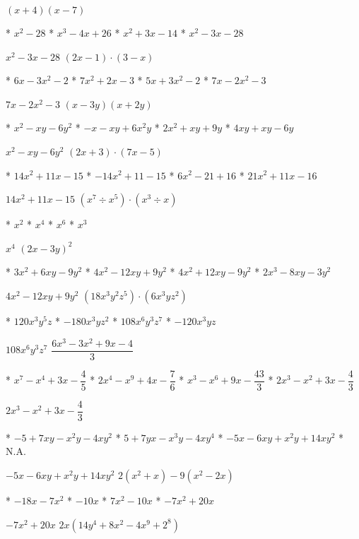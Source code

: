 $(x+4)(x-7)$
\begin{enum}
  * $x^2-28$
  * $x^3-4x+26$
  * $x^2+3x-14$
  * $x^2-3x-28$
\end{enum}
$x^2-3x-28$
$(2x-1)\cdot(3-x)$
\begin{enum}
  * $6x-3x^2-2$
  * $7x^2+2x-3$
  * $5x+3x^2-2$
  * $7x-2x^2-3$
\end{enum}
$7x-2x^2-3$
$(x-3y)(x+2y)$
\begin{enum}
  * $x^2-xy-6y^2$
  * $-x-xy+6x^2y$
  * $2x^2+xy+9y$
  * $4xy+xy-6y$
\end{enum}
$x^2-xy-6y^2$
$(2x+3)\cdot(7x-5)$
\begin{enum}
  * $14x^2+11x-15$
  * $-14x^2+11-15$
  * $6x^2-21+16$
  * $21x^2+11x-16$
\end{enum}
$14x^2+11x-15$
$\left(x^7\div x^5\right)\cdot\left(x^3\div x\right)$
\begin{enum}
  * $x^2$
  * $x^4$
  * $x^6$
  * $x^3$
\end{enum}
$x^4$
$(2x-3y)^2$
\begin{enum}
  * $3x^2+6xy-9y^2$
  * $4x^2-12xy+9y^2$
  * $4x^2+12xy-9y^2$
  * $2x^3-8xy-3y^2$
\end{enum}
$4x^2-12xy+9y^2$
$\left(18x^3y^2z^5\right)\cdot\left(6x^3yz^2\right)$
\begin{enum}
  * $120x^3y^5z$
  * $-180x^3yz^2$
  * $108x^6y^3z^7$
  * $-120x^3yz$
\end{enum}
$108x^6y^3z^7$
$\dfrac{6x^3-3x^2+9x-4}{3}$
\begin{enum}
  * $x^7-x^4+3x-\dfrac45$
  * $2x^4-x^9+4x-\dfrac76$
  * $x^3-x^6+9x-\dfrac{43}{3}$
  * $2x^3-x^2+3x-\dfrac43$
\end{enum}
$2x^3-x^2+3x-\dfrac43$
\begin{enum}
  * $-5+7xy-x^2y-4xy^2$
  * $5+7yx-x^3y-4xy^4$
  * $-5x-6xy+x^2y+14xy^2$
  * N.A.
\end{enum}
$-5x-6xy+x^2y+14xy^2$
$2\left(x^2+x\right)-9\left(x^2-2x\right)$
\begin{enum}
  * $-18x-7x^2$
  * $-10x$
  * $7x^2-10x$
  * $-7x^2+20x$
\end{enum}
$-7x^2+20x$
$2x\left(14y^4+8x^2-4x^9+2^8\right)$
